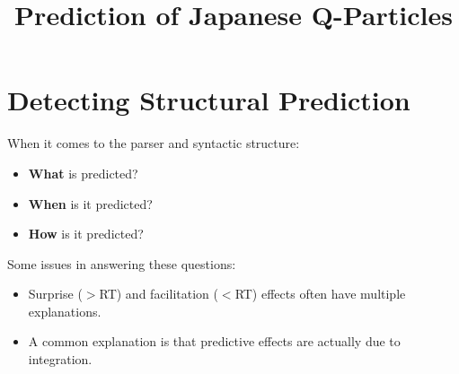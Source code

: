 \documentclass[12pt]{article}
\title{{\normalsize\bfseries {Prediction of Japanese Q-Particles}}}
\author{\normalsize\bfseries {}}
\date{}
\begin{document}
\maketitle

\tableofcontents

\vspace{1.0cm}

\section{Detecting Structural Prediction}
When it comes to the parser and syntactic structure:
\begin{itemize}
    \item \textbf{What} is predicted?
    \item \textbf{When} is it predicted?
    \item \textbf{How} is it predicted?
\end{itemize}

\noindent
Some issues in answering these questions:
\begin{itemize}
    \item Surprise ($>$RT) and facilitation ($<$RT) effects often have multiple explanations.
    \item A common explanation is that predictive effects are actually due to integration.
\end{itemize}


\noindent{}
\vspace{0.2cm}
\end{document}
